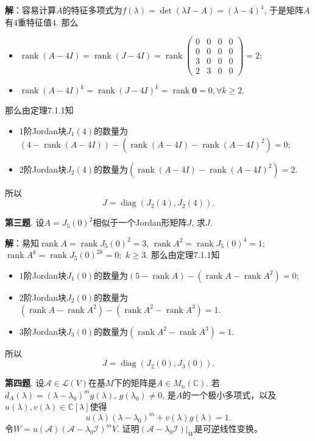 {\bf 解}：容易计算$A$的特征多项式为$f(\lambda) = \det (\lambda I - A) = (\lambda - 4)^4$, 于是矩阵$A$有$4$重特征值$4$. 那么
\begin{itemize}
\item $\operatorname{rank}(A - 4 I) = \operatorname{rank}(J - 4 I) = \operatorname{rank} \begin{pmatrix} 0 & 0 & 0 & 0 \\ 0 & 0 & 0 & 0 \\ 3 & 0 & 0 & 0 \\ 2 & 3 & 0 & 0 \end{pmatrix} = 2;$
\item $\operatorname{rank}(A - 4 I)^k = \operatorname{rank}(J - 4 I)^k = \operatorname{rank} \mathbf{0} = 0, \forall k \geqslant 2.$
\end{itemize}
那么由定理7.1.1知
\begin{itemize}
\item $1$阶Jordan块$J_1(4)$的数量为$(4 - \operatorname{rank}(A - 4 I)) - (\operatorname{rank}(A - 4 I) - \operatorname{rank}(A - 4 I)^2) = 0$;
\item $2$阶Jordan块$J_2(4)$的数量为$(\operatorname{rank}(A - 4 I) - \operatorname{rank}(A - 4 I)^2) = 2$.
\end{itemize}
所以
$$J = \operatorname{diag} (J_2(4), J_2(4)).$$


\newpageorvspace


{\bf 第三题}. 设$A = J_5(0)^2$相似于一个Jordan形矩阵$J$, 求$J$.

{\bf 解}：易知$\operatorname{rank}A = \operatorname{rank} J_5(0)^2 = 3$, $\operatorname{rank}A^2 = \operatorname{rank} J_5(0)^4 = 1;$ $\operatorname{rank}A^k = \operatorname{rank} J_5(0)^{2k} = 0;$ $k \geqslant 3$. 那么由定理7.1.1知
\begin{itemize}
\item $1$阶Jordan块$J_1(0)$的数量为$(5 - \operatorname{rank}A) - (\operatorname{rank}A - \operatorname{rank}A^2) = 0$;
\item $2$阶Jordan块$J_2(0)$的数量为$(\operatorname{rank}A - \operatorname{rank}A^2) - (\operatorname{rank}A^2 - \operatorname{rank}A^3) = 1$.
\item $3$阶Jordan块$J_3(0)$的数量为$(\operatorname{rank}A^2 - \operatorname{rank}A^3) = 1$.
\end{itemize}
所以
$$J = \operatorname{diag} (J_2(0), J_3(0)).$$


\newpageorvspace


{\bf 第四题}. 设$\mathscr{A} \in \mathcal{L}(V)$在基$M$下的矩阵是$A\in M_n(\mathbb{C})$. 若$d_A(\lambda) = (\lambda-\lambda_0)^m g(\lambda)$, $g(\lambda_0) \neq 0$, 是$A$的一个极小多项式，以及$u(\lambda), v(\lambda) \in \mathbb{C}[\lambda]$使得
$$u(\lambda)(\lambda-\lambda_0)^m + v(\lambda)g(\lambda) = 1.$$
令$W = u(\mathscr{A})(\mathscr{A} - \lambda_0\mathscr{I})^m V$. 证明$(\mathscr{A} - \lambda_0\mathscr{I})|_W$是可逆线性变换。

